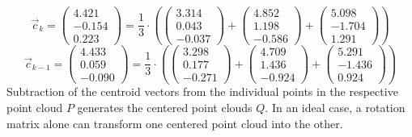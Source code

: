\begin{equation*}
    \vec{c}_{k}=
    \begin{pmatrix}
        4.421 \\
        -0.154 \\
        0.223
    \end{pmatrix}
    =\frac{1}{3}\cdot\left(
    \begin{pmatrix}
        3.314 \\
        0.043 \\
        -0.037
    \end{pmatrix}
    +
    \begin{pmatrix}
        4.852 \\
        1.198 \\
        -0.586
    \end{pmatrix}
    +
    \begin{pmatrix}
        5.098 \\
        -1.704 \\
        1.291
    \end{pmatrix}
    \right)
\end{equation*}
\begin{equation*}
    \vec{c}_{k-1}=
    \begin{pmatrix}
        4.433 \\
        0.059 \\
        -0.090
    \end{pmatrix}
    =\frac{1}{3}\cdot\left(
        \begin{pmatrix}
            3.298 \\
            0.177 \\
            -0.271
        \end{pmatrix}
        +
        \begin{pmatrix}
            4.709 \\
            1.436 \\
            -0.924
        \end{pmatrix}
        +
        \begin{pmatrix}
            5.291 \\
            -1.436 \\
            0.924
        \end{pmatrix}
    \right)
\end{equation*}
Subtraction of the centroid vectors from the individual points in the respective point cloud $P$ generates the centered point clouds $Q$. In an ideal case, a rotation matrix alone can transform one centered point cloud into the other. 
